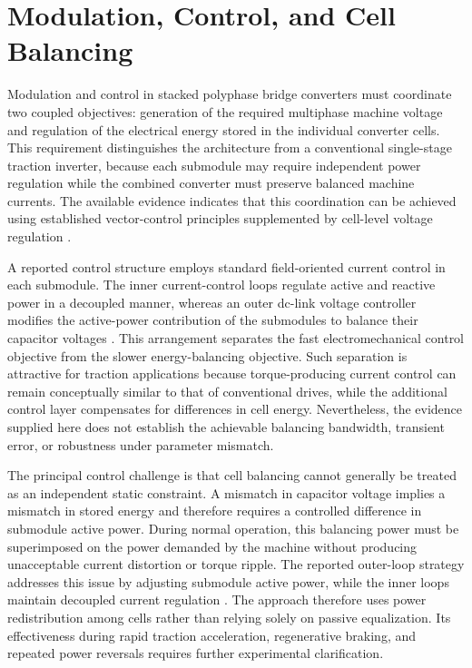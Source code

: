 \section{Modulation, Control, and Cell Balancing}

Modulation and control in stacked polyphase bridge converters must coordinate two coupled objectives: generation of the required multiphase machine voltage and regulation of the electrical energy stored in the individual converter cells. This requirement distinguishes the architecture from a conventional single-stage traction inverter, because each submodule may require independent power regulation while the combined converter must preserve balanced machine currents. The available evidence indicates that this coordination can be achieved using established vector-control principles supplemented by cell-level voltage regulation \cite{Jin2017}.

A reported control structure employs standard field-oriented current control in each submodule. The inner current-control loops regulate active and reactive power in a decoupled manner, whereas an outer dc-link voltage controller modifies the active-power contribution of the submodules to balance their capacitor voltages \cite{Jin2017}. This arrangement separates the fast electromechanical control objective from the slower energy-balancing objective. Such separation is attractive for traction applications because torque-producing current control can remain conceptually similar to that of conventional drives, while the additional control layer compensates for differences in cell energy. Nevertheless, the evidence supplied here does not establish the achievable balancing bandwidth, transient error, or robustness under parameter mismatch. %

The principal control challenge is that cell balancing cannot generally be treated as an independent static constraint. A mismatch in capacitor voltage implies a mismatch in stored energy and therefore requires a controlled difference in submodule active power. During normal operation, this balancing power must be superimposed on the power demanded by the machine without producing unacceptable current distortion or torque ripple. The reported outer-loop strategy addresses this issue by adjusting submodule active power, while the inner loops maintain decoupled current regulation \cite{Jin2017}. The approach therefore uses power redistribution among cells rather than relying solely on passive equalization. Its effectiveness during rapid traction acceleration, regenerative braking, and repeated power reversals requires further experimental clarification. %

